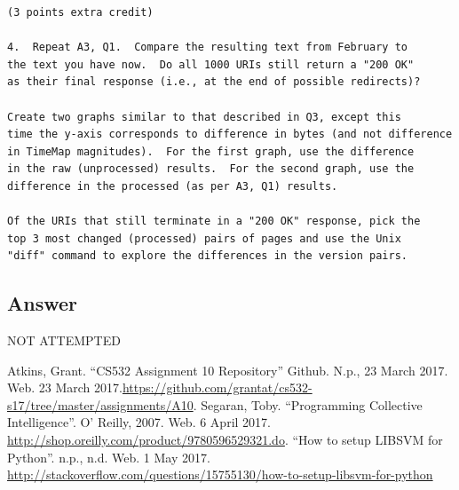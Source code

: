 \documentclass[letterpaper,11pt]{article}
\begin{document}
\begin{verbatim}
(3 points extra credit)

4.  Repeat A3, Q1.  Compare the resulting text from February to 
the text you have now.  Do all 1000 URIs still return a "200 OK" 
as their final response (i.e., at the end of possible redirects)?

Create two graphs similar to that described in Q3, except this 
time the y-axis corresponds to difference in bytes (and not difference
in TimeMap magnitudes).  For the first graph, use the difference
in the raw (unprocessed) results.  For the second graph, use the 
difference in the processed (as per A3, Q1) results.

Of the URIs that still terminate in a "200 OK" response, pick the
top 3 most changed (processed) pairs of pages and use the Unix
"diff" command to explore the differences in the version pairs.
\end{verbatim}

\subsection*{Answer}

\begin{center}
\Huge{NOT ATTEMPTED}
\end{center}


\clearpage


\clearpage



\begin{thebibliography}{9}
Atkins, Grant. ``CS532 Assignment 10 Repository'' Github. N.p., 23 March 2017. Web. 23 March 2017.\url{https://github.com/grantat/cs532-s17/tree/master/assignments/A10}.
Segaran, Toby. ``Programming Collective Intelligence''. O' Reilly, 2007. Web. 6 April 2017. \url{http://shop.oreilly.com/product/9780596529321.do}.
``How to setup LIBSVM for Python''. n.p., n.d. Web. 1 May 2017. \url{http://stackoverflow.com/questions/15755130/how-to-setup-libsvm-for-python}
\end{thebibliography}
\end{document}

